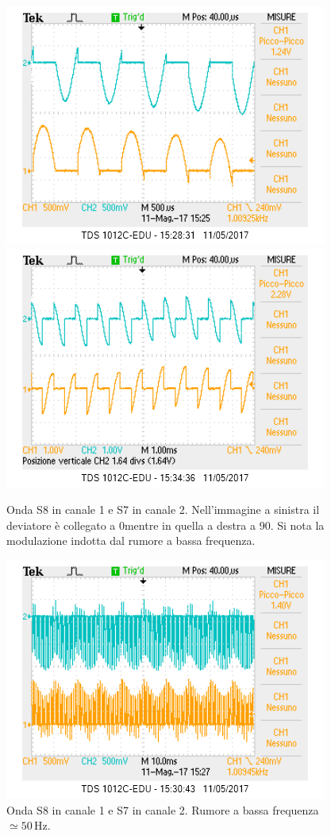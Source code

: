 \documentclass[10pt,a4paper]{article}
\begin{document}
\begin{figure}[!htb]
  \centering
  \includegraphics[scale=0.75]{dev0ch1S8-ch2S7.png}\includegraphics[scale=0.75]{dev90ch1S8-ch2S7.png}
\caption{Onda S8 in canale 1 e S7 in canale 2. Nell'immagine a sinistra il deviatore è collegato a 0\degree mentre in quella a destra a 90\degree . Si nota la modulazione indotta dal rumore a bassa frequenza.\label{osc:S7S8}}
\end{figure}

\begin{figure}[!htb]
  \centering
  \includegraphics[scale=0.75]{perFedech1S8-ch2S7.png}
\caption{Onda S8 in canale 1 e S7 in canale 2. Rumore a bassa frequenza $\simeq 50\,\mbox{Hz}$.\label{osc:rumore50hz}}
\end{figure}
\end{document}

